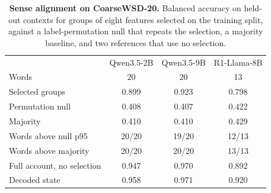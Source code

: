 \begin{table}[!tbp]
\caption{\textbf{Sense alignment on CoarseWSD-20.} Balanced accuracy on
held-out contexts for groups of eight features selected on the training
split, against a label-permutation null that repeats the selection, a
majority baseline, and two references that use no selection.}
\label{tab:app-sense-alignment}
\centering
\scriptsize
\setlength{\tabcolsep}{4.0pt}
\renewcommand{\arraystretch}{1.08}
\begin{tabularx}{\linewidth}{@{}>{\RaggedRight\arraybackslash}Xccc@{}}
\toprule
 & Qwen3.5-2B & Qwen3.5-9B & R1-Llama-8B \\
Words & 20 & 20 & 13 \\
\midrule
Selected groups & 0.899 & 0.923 & 0.798 \\
Permutation null & 0.408 & 0.407 & 0.422 \\
Majority & 0.410 & 0.410 & 0.429 \\
Words above null p95 & 20/20 & 19/20 & 12/13 \\
Words above majority & 20/20 & 20/20 & 13/13 \\
\midrule
Full account, no selection & 0.947 & 0.970 & 0.892 \\
Decoded state & 0.958 & 0.971 & 0.920 \\
\bottomrule
\end{tabularx}
\end{table}

